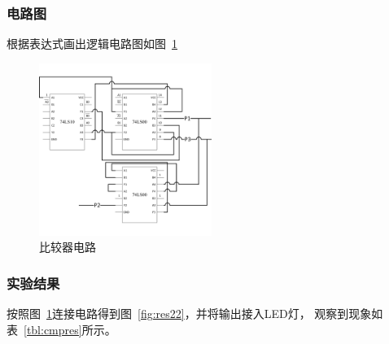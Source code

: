 \documentclass[a4paper,twoside]{ctexart}
\begin{document}
\begin{spacing}{1.2}
\subsubsection{电路图}

根据表达式画出逻辑电路图如图~\ref{fig:cmp}

\begin{figure}[H]
	\centering
	\caption{比较器电路}
	\label{fig:cmp}
	\includegraphics[width=0.5\textwidth]{fig2.png}
\end{figure}

\subsubsection{实验结果}

按照图~\ref{fig:cmp}连接电路得到图~\ref{fig:res22}，并将输出接入LED灯，
观察到现象如表~\ref{tbl:cmpres}所示。


\end{spacing}
\end{document}
